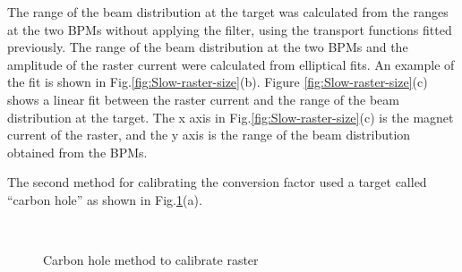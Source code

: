 \documentclass[english,review,number,sort&compress]{elsarticle}
\begin{document}
The range of the beam distribution at the target was calculated from the ranges at the two BPMs without applying the filter, using the transport functions fitted previously. The range of the beam distribution at the two BPMs and the amplitude of the raster current were calculated from elliptical fits. An example of the fit is shown in Fig.\ref{fig:Slow-raster-size}(b). Figure \ref{fig:Slow-raster-size}(c) shows a linear fit between the raster current and the range of the beam distribution at the target. The x axis in Fig.\ref{fig:Slow-raster-size}(c) is the magnet current of the raster, and the y axis is the range of the beam distribution obtained from the BPMs.

The second method for calibrating the conversion factor used a target called ``carbon hole'' as shown in Fig.\ref{fig:Carbon-hole}(a). 
\begin{figure}[tbph]
\begin{centering}
$\qquad$
\par\end{centering}

\protect\caption{\label{fig:Carbon-hole}Carbon hole method to calibrate raster}
\end{figure}
\end{document}
